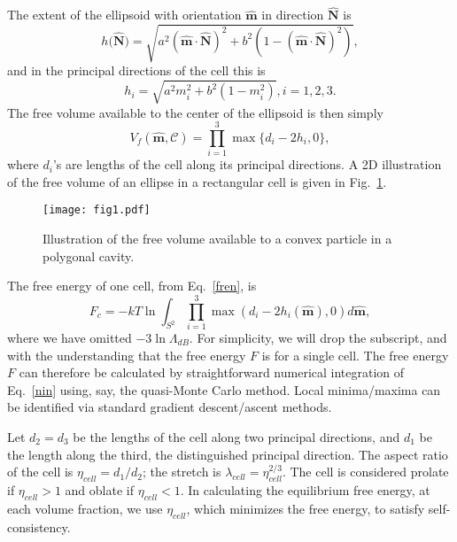 \documentclass{article}
\begin{document}
The extent of the ellipsoid with orientation $\mathbf{\hat{m}}$ in direction 
$\mathbf{\hat{N}}$ is%
\begin{equation}
h(\mathbf{\hat{N})}=\sqrt{a^{2}(\mathbf{\hat{m}\cdot \hat{N}})^{2}+b^{2}(1-(%
\mathbf{\hat{m}\cdot \hat{N}})^{2})},
\end{equation}%
and in the principal directions of the cell this is 
\begin{equation}
h_{i}=\sqrt{a^{2}m_{i}^{2}+b^{2}(1-m_{i}^{2})},i=1,2,3.
\end{equation}%
The free volume available to the center of the ellipsoid is then simply 
\begin{equation}
V_{f}(\mathbf{\hat{m}},\mathcal{C})=\prod_{i=1}^{3}\max \{d_{i}-2h_{i},0\},
\label{eq_V_free}
\end{equation}%
where $d_i$'s are lengths of the cell along its principal directions. A 2D
illustration of the free volume of an ellipse in a rectangular cell is given
in Fig.~\ref{fig_free_volume}. 
\begin{figure}[h]
\begin{center}
\texttt{[image: fig1.pdf]} %
\end{center}
\caption{Illustration of the free volume available to a convex particle in a
polygonal cavity.}
\label{fig_free_volume}
\end{figure}

The free energy of one cell, from Eq.~\eqref{fren}, is 
\begin{equation}
F_{c}=-kT\ln \int_{S^{2}}\prod_{i=1}^{3}\max (d_{i}-2h_{i}(\mathbf{\hat{m}}%
),0)d\mathbf{\hat{m}},  \label{nin}
\end{equation}%
where we have omitted $-3\ln \Lambda _{dB}$. For simplicity, we will drop
the subscript, and with the understanding that the free energy $F$ is for a
single cell. The free energy $F$ can therefore be calculated by
straightforward numerical integration of Eq.~\eqref{nin} using, say, the
quasi-Monte Carlo method. Local minima/maxima can be identified via standard
gradient descent/ascent methods.

Let $d_{2}=d_{3}$ be the lengths of the cell along two principal directions,
and $d_{1}$ be the length along the third, the distinguished principal
direction. The aspect ratio of the cell is $\eta_{cell} =d_{1}/d_{2}$; the
stretch is $\lambda_{cell} =\eta_{cell}^{2/3}$. The cell is considered
prolate if $\eta_{cell} >1$ and oblate if $\eta_{cell} <1$. In calculating
the equilibrium free energy, at each volume fraction, we use $\eta_{cell}$,
which minimizes the free energy, to satisfy self-consistency.
\end{document}
